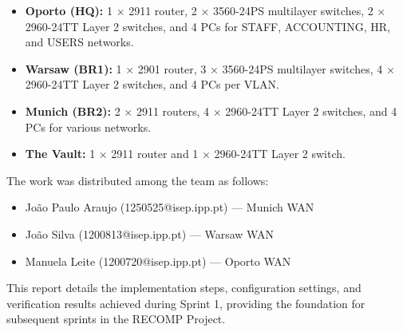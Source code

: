 \documentclass[a4paper,12pt]{report}
\begin{document}
\begin{itemize}
    \item \textbf{Oporto (HQ):} 1 × 2911 router, 2 × 3560-24PS multilayer switches, 2 × 2960-24TT Layer 2 switches, and 4 PCs for STAFF, ACCOUNTING, HR, and USERS networks.
    \item \textbf{Warsaw (BR1):} 1 × 2901 router, 3 × 3560-24PS multilayer switches, 4 × 2960-24TT Layer 2 switches, and 4 PCs per VLAN.
    \item \textbf{Munich (BR2):} 2 × 2911 routers, 4 × 2960-24TT Layer 2 switches, and 4 PCs for various networks.
    \item \textbf{The Vault:} 1 × 2911 router and 1 × 2960-24TT Layer 2 switch.
\end{itemize}

The work was distributed among the team as follows:

\begin{itemize}
    \item João Paulo Araujo (1250525@isep.ipp.pt) — Munich \ac{WAN}
    \item João Silva (1200813@isep.ipp.pt) — Warsaw \ac{WAN}
    \item Manuela Leite (1200720@isep.ipp.pt) — Oporto \ac{WAN}
\end{itemize}

This report details the implementation steps, configuration settings, and verification results achieved during Sprint 1, providing the foundation for subsequent sprints in the \ac{RECOMP} Project.





\end{document}
